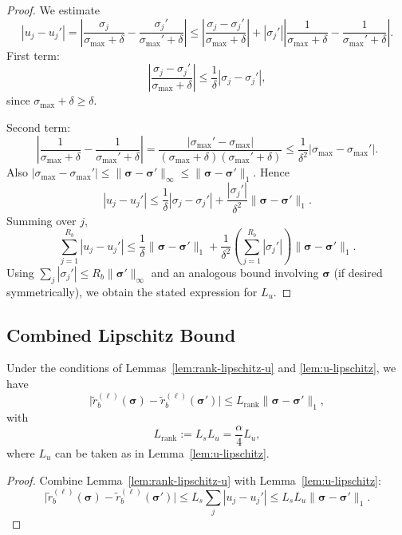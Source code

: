 \documentclass[11pt]{article}
\begin{document}
\begin{proof}
We estimate
\[
|u_j - u_j'|
= \left|\frac{\sigma_j}{\sigma_{\max} + \delta} - \frac{\sigma_j'}{\sigma_{\max}' + \delta}\right|
\le \left|\frac{\sigma_j - \sigma_j'}{\sigma_{\max} + \delta}\right|
+ \left|\sigma_j'\right|\left|\frac{1}{\sigma_{\max} + \delta} - \frac{1}{\sigma_{\max}' + \delta}\right|.
\]
First term:
\[
\left|\frac{\sigma_j - \sigma_j'}{\sigma_{\max} + \delta}\right| 
\le \frac{1}{\delta}|\sigma_j - \sigma_j'|,
\]
since $\sigma_{\max} + \delta \ge \delta$.

Second term:
\[
\left|\frac{1}{\sigma_{\max} + \delta} - \frac{1}{\sigma_{\max}' + \delta}\right|
= \frac{|\sigma_{\max}' - \sigma_{\max}|}{(\sigma_{\max} + \delta)(\sigma_{\max}' + \delta)}
\le \frac{1}{\delta^2}|\sigma_{\max} - \sigma_{\max}'|.
\]
Also $|\sigma_{\max} - \sigma_{\max}'|\le \|\bm{\sigma} - \bm{\sigma}'\|_\infty \le \|\bm{\sigma} - \bm{\sigma}'\|_1$. Hence
\[
|u_j - u_j'|
\le \frac{1}{\delta}|\sigma_j - \sigma_j'|
+ \frac{|\sigma_j'|}{\delta^2}\|\bm{\sigma} - \bm{\sigma}'\|_1.
\]
Summing over $j$,
\[
\sum_{j=1}^{R_b} |u_j - u_j'|
\le \frac{1}{\delta}\|\bm{\sigma} - \bm{\sigma}'\|_1
+ \frac{1}{\delta^2}\left(\sum_{j=1}^{R_b}|\sigma_j'|\right)\|\bm{\sigma} - \bm{\sigma}'\|_1.
\]
Using $\sum_j|\sigma_j'|\le R_b \|\bm{\sigma}'\|_\infty$ and an analogous bound involving $\bm{\sigma}$ (if desired symmetrically), we obtain the stated expression for $L_u$.
\end{proof}

\subsection{Combined Lipschitz Bound}

\begin{proposition}
\label{prop:rank-lipschitz-sigma}
Under the conditions of Lemmas~\ref{lem:rank-lipschitz-u} and \ref{lem:u-lipschitz}, we have
\[
\big|\tilde{r}_b^{(\ell)}(\bm{\sigma}) - \tilde{r}_b^{(\ell)}(\bm{\sigma}')\big|
\le L_{\mathrm{rank}} \|\bm{\sigma} - \bm{\sigma}'\|_1,
\]
with
\[
L_{\mathrm{rank}} := L_s L_u
= \frac{\alpha}{4} L_u,
\]
where $L_u$ can be taken as in Lemma~\ref{lem:u-lipschitz}.
\end{proposition}

\begin{proof}
Combine Lemma~\ref{lem:rank-lipschitz-u} with Lemma~\ref{lem:u-lipschitz}:
\[
\big|\tilde{r}_b^{(\ell)}(\bm{\sigma}) - \tilde{r}_b^{(\ell)}(\bm{\sigma}')\big|
\le L_s \sum_j |u_j - u_j'|
\le L_s L_u \|\bm{\sigma} - \bm{\sigma}'\|_1.
\]
\end{proof}
\end{document}
